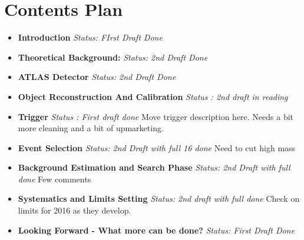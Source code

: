 %
%
%
\chapter{Contents Plan}

\begin{itemize}[leftmargin=*]
\item \textbf{Introduction}\vspace{0.2em}
\textit{Status: FIrst Draft Done}\vspace{0.2em}

\item \textbf{Theoretical Background:}\vspace{0.2em}
  \textit{Status: 2nd Draft Done}\vspace{0.2em}
 

\item \textbf{ATLAS Detector}\vspace{0.2em}
\textit{Status: 2nd Draft Done}\vspace{0.2em}

\item \textbf{Object Reconstruction And Calibration}\vspace{0.2em}
\textit{Status : 2nd draft in reading}\vspace{0.2em}
\noindent

\item \textbf{Trigger}\vspace{0.2em}
\textit{Status : First draft done}\vspace{0.2em}
\noindent
Move trigger description here.\vspace{0.2em}
Needs a bit more cleaning and a bit of upmarketing.\vspace{0.2em}

\item \textbf{Event Selection}\vspace{0.2em}
\textit{Status: 2nd Draft with full 16 done}\vspace{0.2em}
  Need to cut high mass


\item \textbf{Background Estimation and Search Phase}\vspace{0.2em}
\textit{Status: 2nd Draft with full done}
Few comments

\item \textbf{Systematics and Limits Setting}\vspace{0.2em}
\textit{Status: 2nd draft with full done}
Check on limits for 2016 as they develop.

\item \textbf{Looking Forward - What more can be done?}\vspace{0.2em}
\textit{Status: First Draft Done}

\end{itemize}

